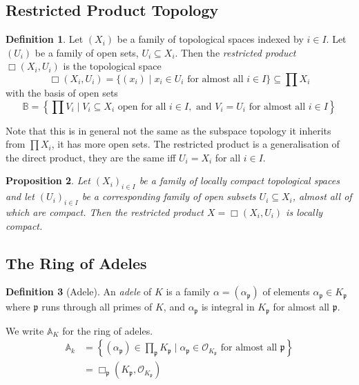 \documentclass[11pt]{article}
\theoremstyle{definition}
\newtheorem{definition}{Definition}[section]
\theoremstyle{plain}
\newtheorem{proposition}[definition]{Proposition}
\theoremstyle{remark}
\newcommand{\bA}{\mathbb{A}}
\newcommand{\cO}{\mathcal{O}}
\newcommand{\fp}{\mathfrak{p}}
\newcommand{\rprod}{\Box} %
\begin{document}
\subsection{Restricted Product Topology}

\begin{definition}\label{def:9_1}
    Let $(X_i)$ be a family of topological spaces indexed by $i \in I$. Let $(U_i)$ be a family of open sets, $U_i \subseteq X_i$. Then the \emph{restricted product} $\rprod (X_i, U_i)$ is the topological space
    \begin{equation*}
        \rprod(X_i, U_i) = \{(x_i) \mid x_i \in U_i \text{ for almost all } i \in I\} \subseteq \prod X_i
    \end{equation*}
    with the basis of open sets
    \begin{equation*}
        \mathbb{B} = \left\{\prod V_i \mid V_i \subseteq X_i \text{ open for all } i \in I, \text{ and } V_i = U_i \text{ for almost all } i \in I\right\}
    \end{equation*}
\end{definition}
Note that this is in general not the same as the subspace topology it inherits from $\prod X_i$, it has more open sets. The restricted product is a generalisation of the direct product, they are the same iff $U_i = X_i$ for all $i \in I$.

\begin{proposition}\label{prop:9_2}
    Let $(X_i)_{i \in I}$ be a family of locally compact topological spaces and let $(U_i)_{i \in I}$ be a corresponding family of open subsets $U_i \subseteq X_i$, almost all of which are compact. Then the restricted product $X = \rprod(X_i, U_i)$ is locally compact.
\end{proposition}

\subsection{The Ring of Adeles}

\begin{definition}[Adele] An \emph{adele} of $K$ is a family $\alpha = (\alpha_\fp)$ of elements $\alpha_\fp \in K_\fp$ where $\fp$ runs through all primes of $K$, and $\alpha_\fp$ is integral in $K_\fp$ for almost all $\fp$.
\end{definition}
We write $\bA_K$ for the ring of adeles.
\begin{align*}
    \bA_k
    &= \left\{(\alpha_\fp) \in \prod_{\fp} K_\fp \mid \alpha_\fp \in \cO_{K_\fp} \text{ for almost all } \fp\right\}\\
    &= \rprod_{\fp} (K_\fp, \cO_{K_\fp})
\end{align*}
\end{document}
